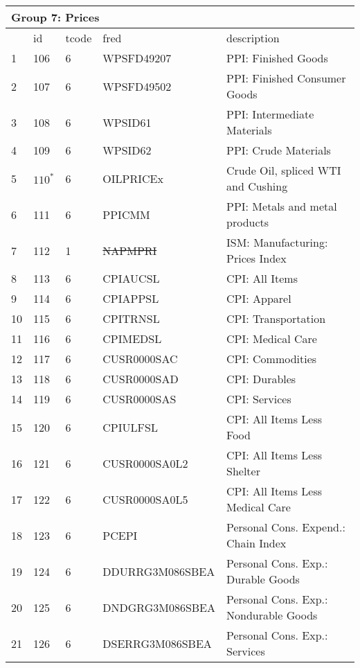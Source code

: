 \begin{table}[ht] 
\centering 
\begin{tabular}{lllll}
\multicolumn{5}{l}{Group 7: Prices} \\
\toprule
 & id & tcode & fred & description \\
\midrule
1 & 106 & 6 & WPSFD49207 & PPI: Finished Goods \\
2 & 107 & 6 & WPSFD49502 & PPI: Finished Consumer Goods \\
3 & 108 & 6 & WPSID61 & PPI: Intermediate Materials \\
4 & 109 & 6 & WPSID62 & PPI: Crude Materials \\
5 & $110^*$ & 6 & OILPRICEx & Crude Oil, spliced WTI and Cushing \\
6 & 111 & 6 & PPICMM & PPI: Metals and metal products \\
7 & 112 & 1 & \sout{NAPMPRI} & ISM: Manufacturing: Prices Index \\
8 & 113 & 6 & CPIAUCSL & CPI: All Items \\
9 & 114 & 6 & CPIAPPSL & CPI: Apparel \\
10 & 115 & 6 & CPITRNSL & CPI: Transportation \\
11 & 116 & 6 & CPIMEDSL & CPI: Medical Care \\
12 & 117 & 6 & CUSR0000SAC & CPI: Commodities \\
13 & 118 & 6 & CUSR0000SAD & CPI: Durables \\
14 & 119 & 6 & CUSR0000SAS & CPI: Services \\
15 & 120 & 6 & CPIULFSL & CPI: All Items Less Food \\
16 & 121 & 6 & CUSR0000SA0L2 & CPI: All Items Less Shelter \\
17 & 122 & 6 & CUSR0000SA0L5 & CPI: All Items Less Medical Care \\
18 & 123 & 6 & PCEPI & Personal Cons. Expend.: Chain Index \\
19 & 124 & 6 & DDURRG3M086SBEA & Personal Cons. Exp.: Durable Goods \\
20 & 125 & 6 & DNDGRG3M086SBEA & Personal Cons. Exp.: Nondurable Goods \\
21 & 126 & 6 & DSERRG3M086SBEA & Personal Cons. Exp.: Services \\
\bottomrule
\end{tabular}  
\end{table} 